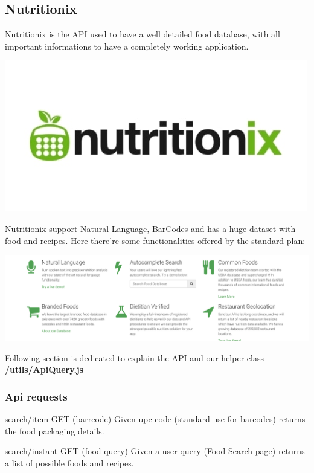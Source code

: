 \documentclass[12pt,hidelinks]{article}
\begin{document}
	\subsection{Nutritionix}\label{subsec:mathenvironments}
		Nutritionix \cite{Nutritionix} is the API used to have a well detailed food database, with all important informations 
		to have a completely working application.
		\begin{center}

			\includegraphics[scale=0.35]{Nutritionix}
		\end{center}
		Nutritionix support Natural Language, BarCodes and has a huge dataset with food and recipes. Here there're some 
		functionalities offered by the standard plan:
		\begin{center}

			\includegraphics[scale=0.3]{Nutritionix detail}
		\end{center}
		Following section is dedicated to explain the API and our helper class \textbf{/utils/ApiQuery.js}
		\subsubsection{Api requests}
		\begin{docCommand}{search/item GET (barrcode)}{}
			Given upc code (standard use for barcodes) returns the food packaging details.
		\end{docCommand}

		\begin{docCommand}{search/instant GET (food query)}{}
			Given a user query (Food Search page) returns a list of possible foods and recipes.
		\end{docCommand}
       
\end{document}
